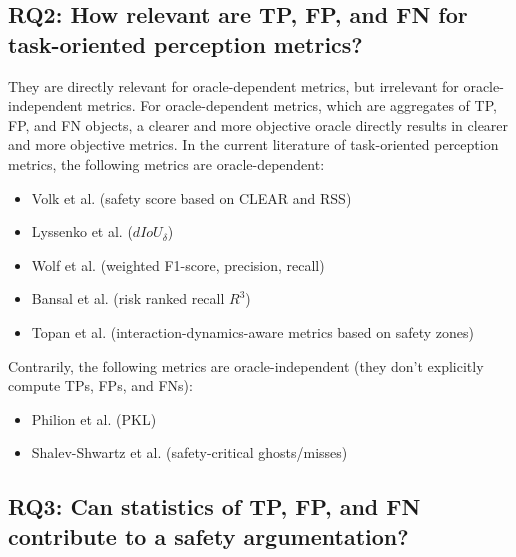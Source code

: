 \documentclass[conference]{IEEEtran}
\begin{document}





\subsection{RQ2: How relevant are TP, FP, and FN for task-oriented perception metrics?}
\label{sec:discussion_rq2}

They are directly relevant for oracle-dependent metrics, but irrelevant for oracle-independent metrics.
For oracle-dependent metrics, which are aggregates of TP, FP, and FN objects, a clearer and more objective oracle directly results in clearer and more objective metrics. 
In the current literature of task-oriented perception metrics, the following metrics are oracle-dependent:
\begin{itemize}
	\item Volk et al. (safety score based on CLEAR and RSS) \cite{Volk2020metric}
	\item Lyssenko et al. ($dIoU_\delta$) \cite{Lyssenko2021relevance}
	\item Wolf et al. (weighted F1-score, precision, recall) \cite{Wolf2021people}
	\item Bansal et al. (risk ranked recall $R^3$) \cite{Bansal2021riskrankedrecall}
	\item Topan et al. (interaction-dynamics-aware metrics based on safety zones) \cite{Topan2022zones}
\end{itemize}
Contrarily, the following metrics are oracle-independent (they don't explicitly compute TPs, FPs, and FNs): %
\begin{itemize}
	\item Philion et al. (PKL) \cite{Philion2020planner_centric}
	\item Shalev-Shwartz et al. (safety-critical ghosts/misses) \cite{shalevshwartz2017formalRSS}
\end{itemize}

\subsection{RQ3: Can statistics of TP, FP, and FN contribute to a safety argumentation?}
\label{sec:discussion_rq3}
\end{document}
